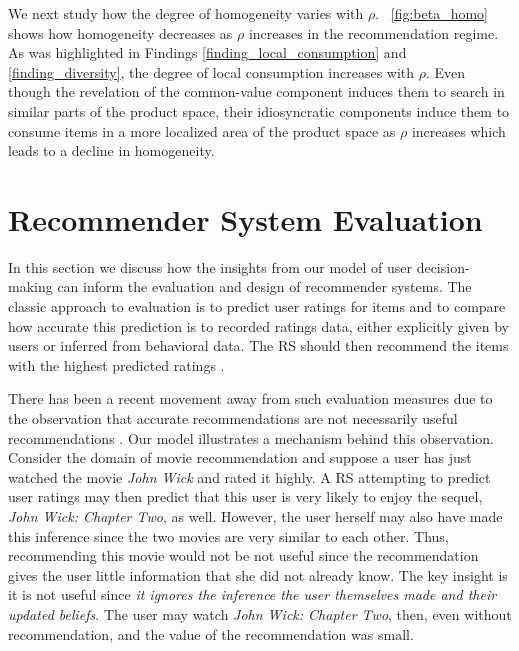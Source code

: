 \documentclass[sigconf]{acmart}
\begin{document}
We next study how the degree of homogeneity varies with $\rho$. ~\autoref{fig:beta_homo} shows how homogeneity decreases as $\rho$ increases in the recommendation regime. As was highlighted in Findings \ref{finding_local_consumption} and \ref{finding_diversity}, the degree of local consumption increases with $\rho$. Even though the revelation of the common-value component induces them to search in similar parts of the product space, their idiosyncratic components induce them to consume items in a more localized area of the product space as $\rho$ increases which leads to a decline in homogeneity.

\section{Recommender System Evaluation}
In this section we discuss how the insights from our model of user decision-making can inform the evaluation and design of recommender systems. The classic approach to evaluation is to predict user ratings for items and to compare how accurate this prediction is to recorded ratings data, either explicitly given by users or inferred from behavioral data. The RS should then recommend the items with the highest predicted ratings \cite{adomavicius2005toward}.


There has been a recent movement away from such evaluation measures due to the observation that accurate recommendations are not necessarily useful recommendations \cite{mcnee2006being}. Our model illustrates a mechanism behind this observation. Consider the domain of movie recommendation and suppose a user has just watched the movie \textit{John Wick} and rated it highly. A RS attempting to predict user ratings may then predict that this user is very likely to enjoy the sequel, \textit{John Wick: Chapter Two}, as well. However, the user herself may also have made this inference since the two movies are very similar to each other. Thus, recommending this movie would not be not useful since the recommendation gives the user little information that she did not already know. The key insight is it is not useful since \textit{it ignores the inference the user themselves made and their updated beliefs}. The user may watch \textit{John Wick: Chapter Two}, then, even without recommendation, and the value of the recommendation was small.
\end{document}
